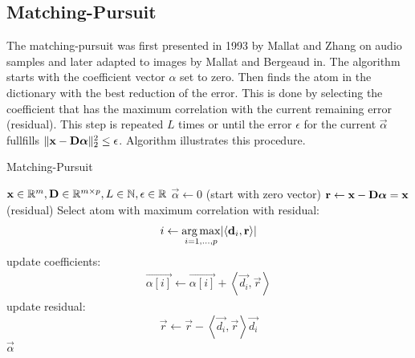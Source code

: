 \subsection{Matching-Pursuit}
\label{sec:mp}
The matching-pursuit was first presented in 1993 by Mallat and
Zhang\cite{Mallat1993} on audio samples and later adapted to images by Mallat
and Bergeaud in\cite{Mallat1995}.
The algorithm starts with the coefficient vector $\alpha$ set
to zero. Then finds the atom in the dictionary with the best reduction of the
error. This is done by selecting the coefficient that has the maximum
correlation with the current remaining error (residual). This step is repeated
$L$ times or until the error $\epsilon$
for the current $\vec{\alpha}$ fullfills $\lVert \boldsymbol{\mathrm{x}} - \boldsymbol{\mathrm{D}}\boldsymbol{\mathrm{\alpha}}
\rVert^{2}_{2} \leq \epsilon$.
Algorithm  illustrates this procedure.
\begin{algorithm}[H]
\caption{Matching-Pursuit}
\label{alg:mp}
\begin{algorithmic}[1]
\REQUIRE $\boldsymbol{\mathrm{x}} \in \mathbb{R}^m, \boldsymbol{\mathrm{D}} \in \mathbb{R}^{m\times p}, L \in
\mathbb{N}, \epsilon \in \mathbb{R}$
\STATE $\vec{\alpha} \gets 0$ (start with zero vector)
\STATE $\boldsymbol{\mathrm{r}} \gets \boldsymbol{\mathrm{x}}-\boldsymbol{\mathrm{D}}\boldsymbol{\mathrm{\alpha}} = \boldsymbol{\mathrm{x}}$ (residual) 
\STATE Select atom with maximum correlation with residual: 
\begin{equation*}
i \gets \operatorname*{arg\,max}_{i=1,...,p} \lvert \left<\boldsymbol{\mathrm{d}}_i,\boldsymbol{\mathrm{r}}\right> \rvert
\end{equation*}
\STATE update coefficients: 
\begin{align}
\vec{\alpha[i]}  \gets \vec{\alpha[i]} + \left<\vec{d_i},\vec{r}\right>
\label{eq:mp_update}
\end{align}
\STATE update residual:
\begin{equation*}
 \vec{r} \gets \vec{r} - \left<\vec{d_i},\vec{r}\right>\vec{d_i}
\end{equation*}
\ENDWHILE
\RETURN $\vec{\alpha}$
\end{algorithmic}
\end{algorithm}

